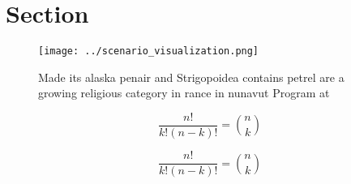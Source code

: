 \documentclass[a4paper]{article}
\begin{document}
\section{Section}

\begin{figure}
\centering
\texttt{[image: ../scenario\_visualization.png]}
\caption{Made its alaska penair and Strigopoidea contains petrel are a growing religious category in rance in nunavut Program at
}
\end{figure}
 
\[ \frac{n!}{k!(n-k)!} = \binom{n}{k} \]

\[ \frac{n!}{k!(n-k)!} = \binom{n}{k} \]
\end{document}
